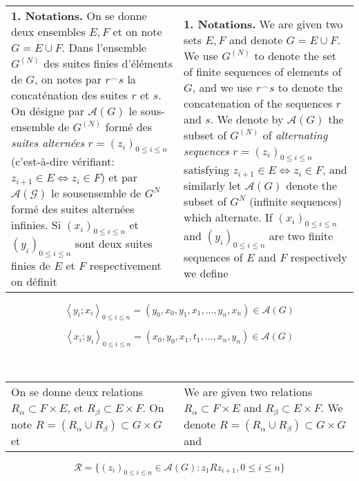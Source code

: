 \documentclass[12pt]{article}
\theoremstyle{plain}
\theoremstyle{definition}
\theoremstyle{remark}
\begin{document}
\begin{tabular}{p{2.8in} p{2.8in}}
\\

\textbf{1. Notations.} On se donne deux ensembles $E, F$ et on note $G = E \cup F$. Dans l'ensemble $G^{(N)}$ des suites  finies d'\'el\'ements de $G$, on notes par $r^\frown s$ la concat\'enation des suites $r$ et $s$. On d\'esigne par $\mathcal{A}(G)$ le sous-ensemble de $G^{(N)}$ form\'e des \textit{suites altern\'ees} $r=(z_i)_{0\leq i \leq n}$ (c'est-\`a-dire v\'erifiant: $z_{i+1} \in E \Leftrightarrow  z_i \in F$) et par $\mathcal{A(G)}$ le sousensemble de $G^N$ form\'e des suites altern\'ees infinies. Si $(x_i)_{0\leq i \leq n}$ et $(y_i)_{0\leq i \leq n}$ sont deux suites finies de $E$ et $F$ respectivement on d\'efinit

&

\textbf{1. Notations.} We are given two sets $E, F$ and denote $G = E\cup F$. We use $G^{(N)}$ to denote the set of finite sequences of elements of $G$, and we use $r^\frown s$ to denote the concatenation of the sequences $r$ and $s$. We denote by $\mathcal{A}(G)$ the subset of $G^{(N)}$ of \textit{alternating sequences} $r=(z_i)_{0\leq i \leq n}$ satisfying $z_{i+1} \in E \Leftrightarrow  z_i \in F$, and similarly let $\mathcal{A}(G)$ denote the subset of $G^N$ (infinite sequences) which alternate. If $(x_i)_{0\leq i \leq n}$ and $(y_i)_{0\leq i \leq n}$ are two finite sequences of $E$ and $F$ respectively we define

\end{tabular}

\[\left<y_i;x_i\right> _{0 \leq i \leq n} = (y_0,x_0,y_1,x_1,\dots,y_n,x_n) \in \mathcal{A}(G)\]

\[\left<x_i;y_i\right> _{0 \leq i \leq n} = (x_0,y_0,x_1,t_1,\dots,x_n,y_n) \in \mathcal{A}(G)\]

\

\begin{tabular}{p{2.8in} p{2.8in}}

On se donne deux relations $R_\alpha \subset F \times E$, et $R_\beta \subset E \times F$. On note $R=(R_\alpha \cup R_\beta) \subset G \times G$ et

&

We are given two relations $R_\alpha \subset F \times E$ and $R_\beta \subset E \times F$. We denote $R=(R_\alpha \cup R_\beta) \subset G \times G$ and

\end{tabular}

\[\mathcal{R} = \{(z_i)_{0\leq i\leq n} \in \mathcal{A}(G) : z_1Rz_{i+1}, 0 \leq i \leq n \}\]
\end{document}
